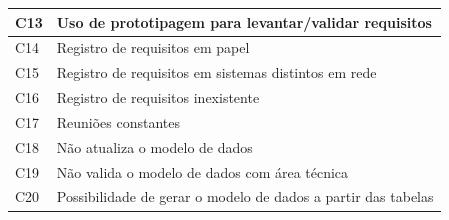 \begin{longtable}{|M{1.3cm} | m{14.0cm}|}
C13            & Uso de prototipagem para levantar/validar requisitos                                                                                                                                                                                                              \\ \hline
C14            & Registro de requisitos em papel                                                                                                                                                                                                                                   \\ \hline
C15            & Registro de requisitos em sistemas distintos em rede                                                                                                                                                                                                              \\ \hline
C16            & Registro de requisitos inexistente                                                                                                                                                                                                                                \\ \hline
C17            & Reuniões constantes                                                                                                                                                                                                                                               \\ \hline
C18            & Não atualiza o modelo de dados                                                                                                                                                                                                                                    \\ \hline
C19            & Não valida o modelo de dados com área técnica                                                                                                                                                                                                                     \\ \hline
C20            & Possibilidade de gerar o modelo de dados a partir das tabelas                                                                                                                                                                                                     \\ \hline

\end{longtable}

